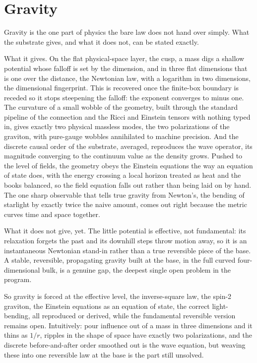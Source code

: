 \section{Gravity}

Gravity is the one part of physics the bare law does not hand over simply. What the substrate gives, and what it does
not, can be stated exactly.

What it gives. On the flat physical-space layer, the cusp, a mass digs a shallow potential whose falloff is set by the
dimension, and in three flat dimensions that is one over the distance, the Newtonian law, with a logarithm in two
dimensions, the dimensional fingerprint. This is recovered once the finite-box boundary is receded so it stops
steepening the falloff: the exponent converges to minus one. The curvature of a small wobble of the geometry, built
through the standard pipeline of the connection and the Ricci and Einstein tensors with nothing typed in, gives exactly
two physical massless modes, the two polarizations of the graviton, with pure-gauge wobbles annihilated to machine
precision. And the discrete causal order of the substrate, averaged, reproduces the wave operator, its magnitude
converging to the continuum value as the density grows. Pushed to the level of fields, the geometry obeys the Einstein
equations the way an equation of state does, with the energy crossing a local horizon treated as heat and the books
balanced, so the field equation falls out rather than being laid on by hand. The one sharp observable that tells true
gravity from Newton's, the bending of starlight by exactly twice the naive amount, comes out right because the metric
curves time and space together.

What it does not give, yet. The little potential is effective, not fundamental: its relaxation forgets the past and its
downhill steps throw motion away, so it is an instantaneous Newtonian stand-in rather than a true reversible piece of
the base. A stable, reversible, propagating gravity built at the base, in the full curved four-dimensional bulk, is a
genuine gap, the deepest single open problem in the program.

So gravity is forced at the effective level, the inverse-square law, the spin-2 graviton, the Einstein equations as an
equation of state, the correct light-bending, all reproduced or derived, while the fundamental reversible version
remains open. Intuitively: pour influence out of a mass in three dimensions and it thins as $1/r$, ripples in the shape
of space have exactly two polarizations, and the discrete before-and-after order smoothed out is the wave equation, but
weaving these into one reversible law at the base is the part still unsolved.
